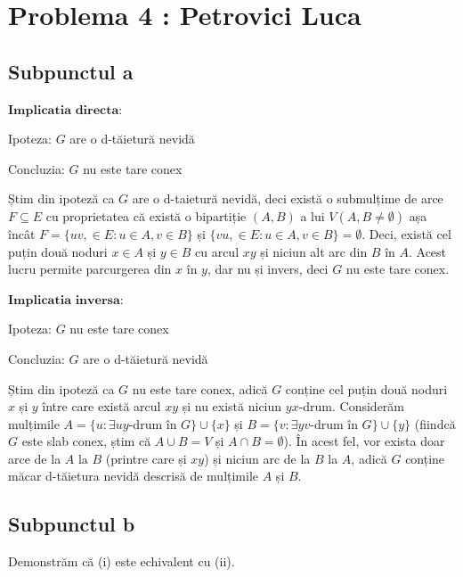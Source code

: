 \documentclass{article}
\begin{document}
{{\section*{\fontsize{20}{50}\selectfont Problema 4 : Petrovici Luca}
\subsection*{\fontsize{16}{30}\selectfont Subpunctul a}
{\fontsize{14}{16}\selectfont
$\mathbf{Implicatia}$ $\mathbf{directa:}$
\\
\par Ipoteza: $G$ are o d-tăietură nevidă
\par Concluzia: $G$ nu este tare conex
\\
\par Știm din ipoteză ca $G$ are o d-taietură nevidă, deci există o submulțime de arce $F \subseteq E$ cu proprietatea că există o bipartiție $(A, B)$ a lui $V (A, B \neq \emptyset)$ așa încât $F = \lbrace uv, \in E : u \in A, v \in B\rbrace$ și $\lbrace vu, \in E : u \in A, v \in B \rbrace = \emptyset$. Deci, există cel puțin două noduri $x \in A$ și $y \in B$ cu arcul $xy$ și niciun alt arc din $B$ în $A$. Acest lucru permite parcurgerea din $x$ în $y$, dar nu și invers, deci $G$ nu este tare conex.
\\
\par $\mathbf{Implicatia}$ $\mathbf{inversa:}$
\\
\par Ipoteza: $G$ nu este tare conex
\par Concluzia: $G$ are o d-tăietură nevidă
\\
\par Știm din ipoteză ca $G$ nu este tare conex, adică $G$ conține cel puțin două noduri $x$ și $y$ între care există arcul $xy$ și nu există niciun $yx$-drum. Considerăm mulțimile $A = \lbrace u : \exists uy$-drum în $ G\rbrace \cup \lbrace x \rbrace$ și $B = \lbrace v : \exists yv$-drum în $ G\rbrace \cup \lbrace y \rbrace$ (fiindcă $G$ este slab conex, știm că $A \cup B = V$ și $A \cap B = \emptyset$). În acest fel, vor exista doar arce de la $A$ la $B$ (printre care și $xy$) și niciun arc de la $B$ la $A$, adică $G$ conține măcar d-tăietura nevidă descrisă de mulțimile $A$ și $B$.

\subsection*{\fontsize{16}{30}\selectfont Subpunctul b}
Demonstrăm că (i) este echivalent cu (ii).

}}}
\end{document}
